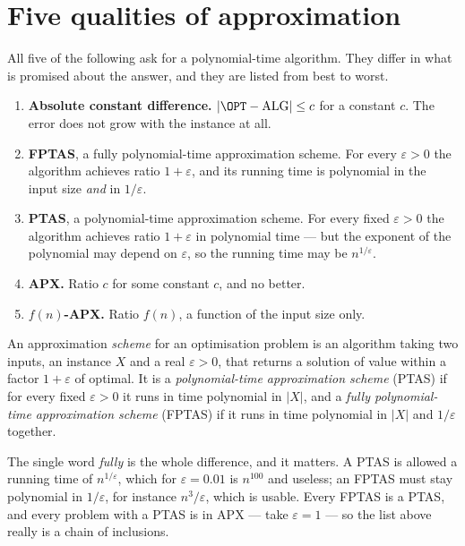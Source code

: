 \section{Five qualities of approximation}
\label{sec:approx-qualities}

All five of the following ask for a polynomial-time algorithm. They differ in
what is promised about the answer, and they are listed from best to worst.

\begin{enumerate}[leftmargin=*,label=\arabic*.]
  \item \textbf{Absolute constant difference.}
        $|\OPT - \mathrm{ALG}| \le c$ for a constant $c$. The error does not
        grow with the instance at all.
  \item \textbf{FPTAS}, a fully polynomial-time approximation scheme. For every
        $\varepsilon > 0$ the algorithm achieves ratio $1+\varepsilon$, and its
        running time is polynomial in the input size \emph{and} in
        $1/\varepsilon$.
  \item \textbf{PTAS}, a polynomial-time approximation scheme. For every fixed
        $\varepsilon > 0$ the algorithm achieves ratio $1+\varepsilon$ in
        polynomial time --- but the exponent of the polynomial may depend on
        $\varepsilon$, so the running time may be $n^{1/\varepsilon}$.
  \item \textbf{APX.} Ratio $c$ for some constant $c$, and no better.
  \item \textbf{$f(n)$-APX.} Ratio $f(n)$, a function of the input size only.
\end{enumerate}

\begin{definition}\label{def:ptas-fptas}
An approximation \emph{scheme} for an optimisation problem is an algorithm
taking two inputs, an instance $X$ and a real $\varepsilon > 0$, that returns a
solution of value within a factor $1+\varepsilon$ of optimal. It is a
\emph{polynomial-time approximation scheme} (PTAS) if for every fixed
$\varepsilon > 0$ it runs in time polynomial in $|X|$, and a \emph{fully
polynomial-time approximation scheme} (FPTAS) if it runs in time polynomial in
$|X|$ and $1/\varepsilon$ together.
\end{definition}

The single word \emph{fully} is the whole difference, and it matters. A PTAS is
allowed a running time of $n^{1/\varepsilon}$, which for $\varepsilon = 0.01$ is
$n^{100}$ and useless; an FPTAS must stay polynomial in $1/\varepsilon$, for
instance $n^3/\varepsilon$, which is usable. Every FPTAS is a PTAS, and every
problem with a PTAS is in \textrm{APX} --- take $\varepsilon = 1$ --- so the
list above really is a chain of inclusions.

